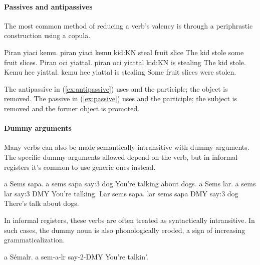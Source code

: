 \paragraph{Passives and antipassives} 
The most common method of reducing a verb's valency is through a periphrastic construction using a copula.

\begin{subexamples}
	\ex
		\script Piran yiaci kemu.
		\bits piran yiaci kemu
		\gloss kid:KN steal {fruit slice}
		\tr The kid stole some fruit slices.
	\ex \label{ex:antipassive}
		\script Piran oci yiattal.
		\bits piran oci yiattal
		\gloss kid:KN is stealing
		\tr The kid stole.
	\ex \label{ex:passive}
		\script Kemu hec yiattal.
		\bits kemu hec yiattal
		 is stealing
		\tr Some fruit slices were stolen.
\end{subexamples}

The antipassive in (\ref{ex:antipassive}) uses  and the participle; the object is removed. The passive in (\ref{ex:passive}) uses  and the participle; the subject is removed and the former object is promoted.

\paragraph{Dummy arguments}
Many verbs can also be made semantically intransitive with dummy arguments. The specific dummy arguments allowed depend on the verb, but in informal registers it's common to use generic ones instead.

\begin{subexamples}
	\ex
		\script a Sems sapa.
		\bits a sems sapa
		 say:3 dog
		\tr You're talking about dogs.
	\ex
		\script a Sems lar.
		\bits a sems lar
		 say:3 DMY
		\tr You're talking.
	\ex
		\script Lar sems sapa.
		\bits lar sems sapa
		\gloss DMY say:3 dog
		\tr There's talk about dogs.
\end{subexamples}

In informal registers, these verbs are often treated as syntactically intransitive. In such cases, the dummy noun is also phonologically eroded, a sign of increasing grammaticalization.

\begin{example}
	\script a Sémalr.
	\bits a sem-a-lr
	 say-2-DMY
	\tr You're talkin'.
\end{example}

